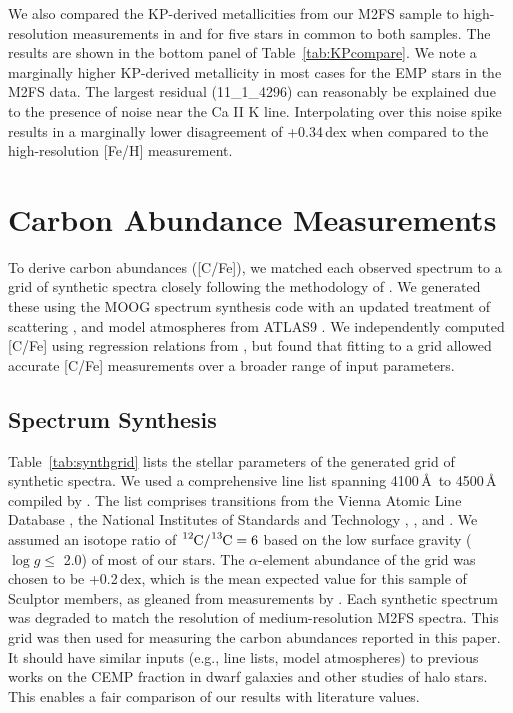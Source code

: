 \documentclass{emulateapj-rtx4}
\begin{document}
We also compared the KP-derived metallicities from our M2FS sample to high-resolution measurements in \citet{sjf+15}
and \citet{jnm+15} for five stars in common to both samples. The results are shown in the bottom panel of Table~\ref{tab:KPcompare}.
We note a marginally higher KP-derived metallicity in most cases for the EMP stars in the M2FS data.
The largest residual (11\_1\_4296) can reasonably be explained due to the presence of noise near the Ca II K line.
Interpolating over this noise spike results in a marginally lower disagreement of +0.34\,dex when compared to the high-resolution [Fe/H] measurement.

\section{Carbon Abundance Measurements}
\label{sec:carbon}

To derive carbon abundances ([C/Fe]), we matched each observed
spectrum to a grid of synthetic spectra closely following the methodology of \citet{kgz+15}. 
We generated these using the MOOG spectrum synthesis code with an updated treatment 
of scattering \citep{s+73,sks+11}, and model atmospheres from ATLAS9 \citep{ck+04}. 
We independently computed [C/Fe] using regression relations from \citet{rbs+05}, but found that 
fitting to a grid allowed accurate [C/Fe] measurements over a broader range of 
input parameters.

\subsection{Spectrum Synthesis}
\label{sec:synth}

Table~\ref{tab:synthgrid} lists the stellar parameters of the generated grid of synthetic spectra.
We used a comprehensive line list spanning 4100\,\AA\, to 4500\,\AA\, compiled by \citet{kgz+15}. 
The list comprises transitions from the 
Vienna Atomic Line Database \citep[VALD;][]{pkr+95, kpr+99}, the National 
Institutes of Standards and Technology \citep[NIST;][]{NIST_ASD}, \citet{k+92},
and \citet{jli+96}. We assumed an isotope ratio of $\ce{^{12}C}/\ce{^{13}C} = 6$
based on the low surface gravity ($\log g \le$ 2.0) of most of our stars. The $\alpha$-element
abundance of the grid was chosen to be +0.2\,dex, which is the mean expected
value for this sample of Sculptor members, as gleaned from measurements by
\citet{kgb+09}. Each synthetic spectrum was degraded to match the resolution 
of medium-resolution M2FS spectra.
This grid was then used for measuring the carbon abundances reported in this paper. 
It should have similar inputs (e.g., line lists, model atmospheres) to previous works on the CEMP fraction in dwarf galaxies \citep[e.g.,][]{kgz+15} and other studies of halo stars. 
This enables a fair comparison of our results with literature values.
\end{document}

